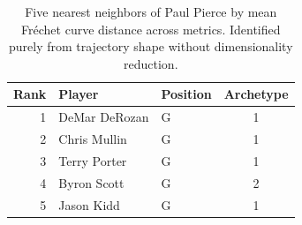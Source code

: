 \begin{table}[htbp]
  \centering\small
  \begin{tabular}{rllc}
    \toprule
    Rank & Player & Position & Archetype \\
    \midrule
    1 & DeMar DeRozan & G & 1 \\
    2 & Chris Mullin & G & 1 \\
    3 & Terry Porter & G & 1 \\
    4 & Byron Scott & G & 2 \\
    5 & Jason Kidd & G & 1 \\
    \bottomrule
  \end{tabular}
  \caption{Five nearest neighbors of Paul Pierce by mean Fr\'{e}chet curve distance across metrics. Identified purely from trajectory shape without dimensionality reduction.}
  \label{tab:Paul_Pierce_frechet_curve_neighbors}
\end{table}

